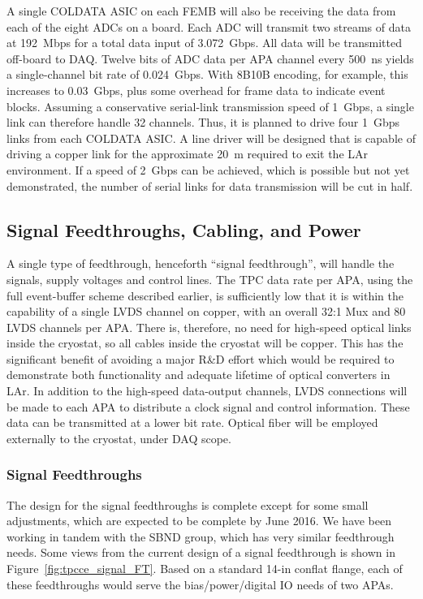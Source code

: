 A single COLDATA ASIC on each FEMB will also be receiving the data from each of the eight ADCs on a board.
Each ADC will transmit two streams of data at 192~Mbps for a total data input of 3.072~Gbps.
All data will be transmitted off-board to DAQ.
Twelve bits of ADC data per APA channel every 500~ns yields a single-channel bit rate of 0.024~Gbps.
With 8B10B encoding, for example, this increases to 0.03~Gbps, plus some overhead for frame data to indicate event blocks.
Assuming a conservative serial-link transmission speed of 1~Gbps, a single link can therefore handle 32 channels.
Thus, it is planned to drive four 1~Gbps links from each COLDATA ASIC.
A line driver will be designed that is capable of driving a copper link for the approximate 20~m required
to exit the LAr environment.
If a speed of 2~Gbps can be achieved, which is possible but not yet demonstrated,
the number of serial links for data transmission will be cut in half.

%
\subsection{Signal Feedthroughs, Cabling, and Power}
\label{subsec:ce_feedthrough}

A single type of feedthrough, henceforth ``signal feedthrough'', will handle the signals, supply voltages and control lines.
The TPC data rate per APA, using the full event-buffer scheme described earlier,
is sufficiently low that it is within the capability of a single LVDS channel on copper,
with an overall 32:1 Mux and 80 LVDS channels per APA.
There is, therefore, no need for high-speed optical links inside the cryostat, so all cables inside the cryostat will be copper.
This has the significant benefit of avoiding a major R\&D effort which would be required to demonstrate
both functionality and adequate lifetime of optical converters in LAr.
In addition to the high-speed data-output channels,
LVDS connections will be made to each APA to distribute a clock signal and control information.
These data can be transmitted at a lower bit rate.
Optical fiber will be employed externally to the cryostat, under DAQ scope.

%
\subsubsection{Signal Feedthroughs }
\label{subsubsec:ce_feedthroughs}

The design for the signal feedthroughs is complete except for some small adjustments,
which are expected to be complete by June 2016.
We have been working in tandem with the SBND group, which has very similar feedthrough needs.
Some views from the current design of a signal feedthrough is shown in Figure~\ref{fig:tpcce_signal_FT}.
Based on a standard 14-in conflat flange,
each of these feedthroughs would serve the bias/power/digital IO needs of two APAs.  

